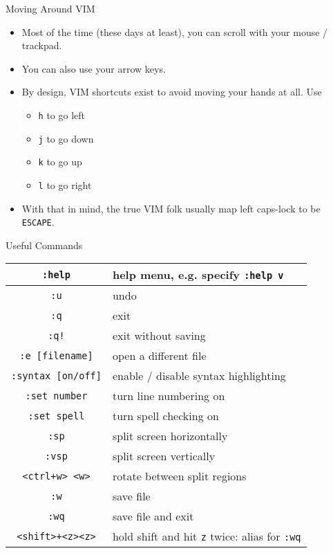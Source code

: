 \documentclass[11pt]{beamer}
\begin{document}
\begin{frame}[fragile]{Moving Around VIM}
  \begin{itemize}[<+- | alert@+>]
    \item Most of the time (these days at least), you can scroll with your mouse / trackpad.
    \item You can also use your arrow keys.
    \item By design, VIM shortcuts exist to avoid moving your hands at all.  Use
    \begin{itemize}[<+- | alert@+>]
      \item \texttt{h} to go left
      \item \texttt{j} to go down
      \item \texttt{k} to go up
      \item \texttt{l} to go right
    \end{itemize}
    \item With that in mind, the true VIM folk usually map left caps-lock to be \texttt{ESCAPE}.
  \end{itemize}
\end{frame}

\begin{frame}[fragile]{Useful Commands}
  \vspace*{-3ex}
  \begin{center}
    \begin{tabular}{|c|l|}
      \hline
      \texttt{:help} & help menu, e.g. specify \texttt{:help v}\\ \hline
      \texttt{:u} & undo\\ \hline
      \texttt{:q} & exit\\ \hline
      \texttt{:q!} & exit without saving\\ \hline
      \texttt{:e [filename]} & open a different file\\ \hline
      \texttt{:syntax [on/off]} & enable / disable syntax highlighting\\ \hline
      \texttt{:set number} & turn line numbering on\\ \hline
      \texttt{:set spell} & turn spell checking on\\ \hline
      \texttt{:sp} & split screen horizontally\\ \hline
      \texttt{:vsp} & split screen vertically\\ \hline
      \texttt{<ctrl+w> <w>} & rotate between split regions\\ \hline
      \texttt{:w} & save file\\ \hline
      \texttt{:wq} & save file and exit\\ \hline
      \texttt{<shift>+<z><z>} & hold shift and hit \texttt{z} twice: alias for \texttt{:wq}\\ \hline
    \end{tabular}
  \end{center}
\end{frame}
\end{document}
